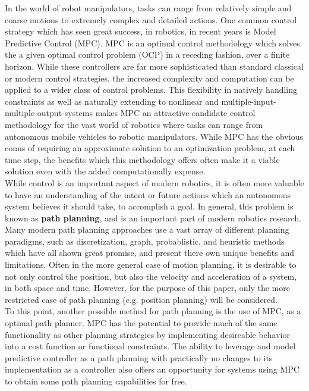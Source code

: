 \documentclass[journal]{IEEEtran}
\begin{document}
In the world of robot manipulators, tasks can range from relatively simple and coarse motions to extremely complex and detailed actions. One common control strategy which has seen great success, in robotics, in recent years is Model Predictive Control (MPC). MPC is an optimal control methodology which solves the a given optimal control problem (OCP) in a receding fashion, over a finite horizon. While these controllers are far more sophisticated than standard classical or modern control strategies, the increased complexity and computation can be applied to a wider class of control problems. This flexibility in natively handling constraints as well as naturally extending to nonlinear and multiple-input-multiple-output-systems makes MPC an attractive candidate control methodology for the vast world of robotics where tasks can range from autonomous mobile vehicles to robotic manipulators. While MPC has the obvious conns of requiring an approximate solution to an optimization problem, at each time step, the benefits which this methodology offers often make it a viable solution even with the added computationally expense. \\

While control is an important aspect of modern robotics, it is often more valuable to have an understanding of the intent or future actions which an autonomous system believes it should take, to accomplish a goal. In general, this problem is known as \textbf{path planning}, and is an important part of modern robotics research. Many modern path planning approaches use a vast array of different planning paradigms, such as discretization, graph, probablistic, and heuristic methods which have all shown great promise, and present there own unique benefits and limitations. Often in the more general case of motion planning, it is desirable to not only control the position, but also the velocity and acceleration of a system, in both space and time. However, for the purpose of this paper, only the more restricted case of path planning (e.g. position planning) will be considered.  \\

To this point, another possible method for path planning is the use of MPC, as a optimal path planner. MPC has the potential to provide much of the same functionality as other planning strategies by implementing desireable behavior into a cost function or functional constraints. The ability to leverage and model predictive controller as a path planning with practically no changes to its implementation as a controller also offers an opportunity for systems using MPC to obtain some path planning capabilities for free.   \\
\end{document}
